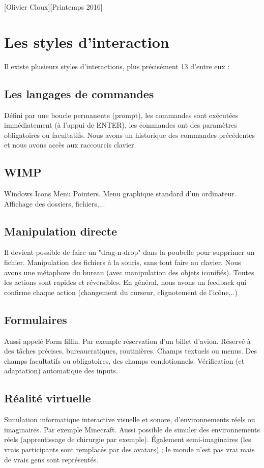 \documentclass[12pt,a4paper]{article}
\begin{document}
[Olivier Cloux][Printemps 2016]
\newpage
\begin{multicols}{2}
	\tableofcontents
\end{multicols}

\section{Les styles d'interaction}
Il existe plusieurs styles d'interactions, plus précisément 13 d'entre eux :
\subsection{Les langages de commandes}
Défini par une boucle permanente (prompt), les commandes sont exécutées immédiatement (à l'appui de ENTER), les commandes ont des paramètres obligatoires ou facultatifs. Nous avons un historique des commandes précédentes et nous avons accès aux raccourcis clavier.

\subsection{WIMP}
Windows Icons Menu Pointers. Menu graphique standard d'un ordinateur. Affichage des dossiers, fichiers,...

\subsection{Manipulation directe}
Il devient possible de faire un "drag-n-drop" dans la poubelle pour supprimer un fichier. Manipulation des fichiers à la souris, sans tout faire au clavier. Nous avons une métaphore du bureau (avec manipulation des objets iconifiés). Toutes les actions sont rapides et réversibles. En général, nous avons un feedback qui confirme chaque action (changement du curseur, clignotement de l'icône,..)


\subsection{Formulaires}
Aussi appelé Form fillin. Par exemple réservation d'un billet d'avion. Réservé à des tâches précises, bureaucratiques, routinières. Champs textuels ou menus. Des champs facultatifs ou obligatoires, des champs condotionnels. Vérification (et adaptation) automatique des inputs.

\subsection{Réalité virtuelle}
Simulation informatique interactive visuelle et sonore, d'environnements réels ou imaginaires. Par exemple Minecraft. Aussi possible de simuler des environnements réels (apprentissage de chirurgie par exemple). Également semi-imaginaires (les vrais participants sont remplacés par des avatars) ; le monde n'est pas vrai mais de vrais gens sont représentés.
\end{document}

